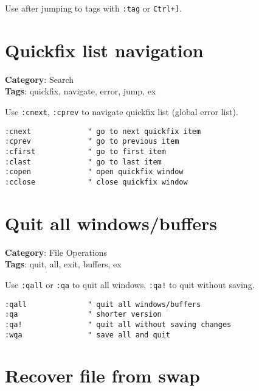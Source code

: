 {{{{{{Use after jumping to tags with {\footnotesize \Verb§:tag§} or {\footnotesize \Verb§Ctrl+]§}.

\section{Quickfix list navigation}

\textbf{Category}: Search\\ \textbf{Tags}: quickfix, navigate, error, jump, ex
\vspace{0.5cm}

Use {\footnotesize \Verb§:cnext§}, {\footnotesize \Verb§:cprev§} to navigate quickfix list (global error list).

\begin{Exa*}{}
\begin{Verbatim}[fontsize=\footnotesize, breaklines, breakanywhere]
:cnext             " go to next quickfix item
:cprev             " go to previous item  
:cfirst            " go to first item
:clast             " go to last item
:copen             " open quickfix window
:cclose            " close quickfix window
\end{Verbatim}
\end{Exa*}

\section{Quit all windows/buffers}

\textbf{Category}: File Operations\\ \textbf{Tags}: quit, all, exit, buffers, ex
\vspace{0.5cm}

Use {\footnotesize \Verb§:qall§} or {\footnotesize \Verb§:qa§} to quit all windows, {\footnotesize \Verb§:qa!§} to quit without saving.

\begin{Exa*}{}
\begin{Verbatim}[fontsize=\footnotesize, breaklines, breakanywhere]
:qall              " quit all windows/buffers
:qa                " shorter version
:qa!               " quit all without saving changes
:wqa               " save all and quit
\end{Verbatim}
\end{Exa*}

\section{Recover file from swap}

}}}}}}

